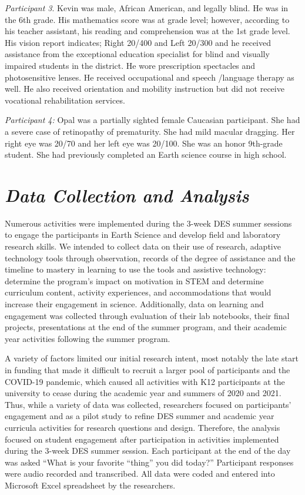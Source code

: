 \documentclass[11pt]{sig-alternate}
\begin{document}
\begin{large}
\textit{Participant 3}. Kevin was male, African American, and legally blind. He was in the 6th grade. His mathematics score was at grade level; however, according to his teacher assistant, his reading and comprehension was at the 1st grade level. His vision report indicates; Right 20/400 and Left 20/300 and he received assistance from the exceptional education specialist for blind and visually impaired students in the district. He wore prescription spectacles and photosensitive lenses. He received occupational and speech /language therapy as well. He also received orientation and mobility instruction but did not receive vocational rehabilitation services.

\textit{Participant 4:} Opal was a partially sighted female Caucasian participant. She had a severe case of retinopathy of prematurity.  She had mild macular dragging. Her right eye was 20/70 and her left eye was 20/100. She was an honor 9th-grade student.  She had previously completed an Earth science course in high school. 

\section*{\textit{Data Collection and Analysis}}

Numerous activities were implemented during the 3-week DES summer sessions to engage the participants in Earth Science and develop field and laboratory research skills. We intended to collect data on their use of research, adaptive technology tools through observation, records of the degree of assistance and the timeline to mastery in learning to use the tools and assistive technology: determine the program’s impact on motivation in STEM and determine curriculum content, activity experiences, and accommodations that would increase their engagement in science. Additionally, data on learning and engagement was collected through evaluation of their lab notebooks, their final projects, presentations at the end of the summer program, and their academic year activities following the summer program. 

A variety of factors limited our initial research intent, most notably the late start in funding that made it difficult to recruit a larger pool of participants and the COVID-19 pandemic, which caused all activities with K12 participants at the university to cease during the academic year and summers of 2020 and 2021.  Thus, while a variety of data was collected, researchers focused on participants’ engagement and as a pilot study to refine DES summer and academic year curricula activities for research questions and design.  Therefore, the analysis focused on student engagement after participation in activities implemented during the 3-week DES summer session.  Each participant at the end of the day was asked “What is your favorite “thing” you did today?” Participant responses were audio recorded and transcribed.  All data were coded and entered into Microsoft Excel spreadsheet by the researchers. 


\end{large}
\end{document}
